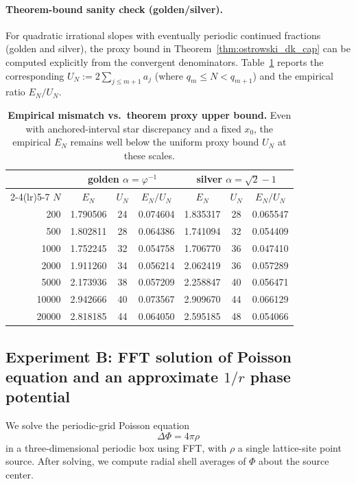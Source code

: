 \paragraph{Theorem-bound sanity check (golden/silver).}
For quadratic irrational slopes with eventually periodic continued fractions (golden and silver), the proxy bound in Theorem~\ref{thm:ostrowski_dk_cap} can be computed explicitly from the convergent denominators. Table~\ref{tab:EN_bound_ratio} reports the corresponding $U_N:=2\sum_{j\le m+1}a_j$ (where $q_m\le N<q_{m+1}$) and the empirical ratio $E_N/U_N$.
\begin{table}[t]
\centering
\begin{tabular}{@{}rccc ccc@{}}
\toprule
& \multicolumn{3}{c}{golden $\alpha=\varphi^{-1}$} & \multicolumn{3}{c}{silver $\alpha=\sqrt{2}-1$} \\
\cmidrule(lr){2-4}\cmidrule(lr){5-7}
$N$ & $E_N$ & $U_N$ & $E_N/U_N$ & $E_N$ & $U_N$ & $E_N/U_N$ \\
\midrule
200   & 1.790506 & 24 & 0.074604 & 1.835317 & 28 & 0.065547 \\
500   & 1.802811 & 28 & 0.064386 & 1.741094 & 32 & 0.054409 \\
1000  & 1.752245 & 32 & 0.054758 & 1.706770 & 36 & 0.047410 \\
2000  & 1.911260 & 34 & 0.056214 & 2.062419 & 36 & 0.057289 \\
5000  & 2.173936 & 38 & 0.057209 & 2.258847 & 40 & 0.056471 \\
10000 & 2.942666 & 40 & 0.073567 & 2.909670 & 44 & 0.066129 \\
20000 & 2.818185 & 44 & 0.064050 & 2.595185 & 48 & 0.054066 \\
\bottomrule
\end{tabular}
\caption{\textbf{Empirical mismatch vs.\ theorem proxy upper bound.} Even with anchored-interval star discrepancy and a fixed $x_0$, the empirical $E_N$ remains well below the uniform proxy bound $U_N$ at these scales.}
\label{tab:EN_bound_ratio}
\end{table}

\subsection{Experiment B: FFT solution of Poisson equation and an approximate \texorpdfstring{$1/r$}{1/r} phase potential}
\label{subsec:expB}

We solve the periodic-grid Poisson equation
\begin{equation}
  \Delta\Phi = 4\pi\rho
\end{equation}
in a three-dimensional periodic box using FFT, with $\rho$ a single lattice-site point source. After solving, we compute radial shell averages of $\Phi$ about the source center.

